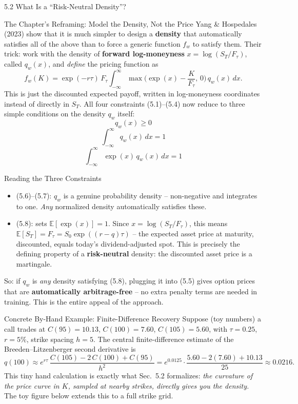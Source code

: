\documentclass[aspectratio=169,10pt]{beamer}
\newcommand{\Exp}{\mathbb{E}}
\begin{document}
\begin{frame}[allowframebreaks]{5.2 What Is a ``Risk-Neutral Density''?}
\framebreak

\begin{block}{The Chapter's Reframing: Model the Density, Not the Price}
Yang \& Hospedales (2023) show that it is much simpler to design a
\textbf{density} that automatically satisfies all of the above than to force
a generic function $f_w$ to satisfy them. Their trick: work with the density
of \textbf{forward log-moneyness} $x = \log(S_T/F_\tau)$, called $q_w(x)$,
and \emph{define} the pricing function as
\[
f_w(K) = \exp(-r\tau)\,F_\tau \int_{-\infty}^{\infty}
   \max\!\Big(\exp(x) - \frac{K}{F_\tau},\,0\Big)\,q_w(x)\,dx. \tag{5.5}
\]
This is just the discounted expected payoff, written in log-moneyness
coordinates instead of directly in $S_T$. All four constraints (5.1)--(5.4)
now reduce to three simple conditions on the density $q_w$ itself:
\[
q_w(x) \ge 0 \tag{5.6}
\]
\[
\int_{-\infty}^{\infty} q_w(x)\,dx = 1 \tag{5.7}
\]
\[
\int_{-\infty}^{\infty} \exp(x)\,q_w(x)\,dx = 1 \tag{5.8}
\]
\end{block}

\framebreak

\begin{block}{Reading the Three Constraints}
\begin{itemize}
  \item (5.6)--(5.7): $q_w$ is a genuine probability density -- non-negative
  and integrates to one. \emph{Any} normalized density automatically
  satisfies these.
  \item (5.8): sets $\Exp[\exp(x)] = 1$. Since $x=\log(S_T/F_\tau)$, this
  means $\Exp[S_T] = F_\tau = S_0\exp((r-q)\tau)$ -- the expected asset
  price at maturity, discounted, equals today's dividend-adjusted spot. This
  is precisely the defining property of a \textbf{risk-neutral} density: the
  discounted asset price is a martingale.
\end{itemize}
So: if $q_w$ is \emph{any} density satisfying (5.8), plugging it into
(5.5) gives option prices that are \textbf{automatically arbitrage-free} --
no extra penalty terms are needed in training. This is the entire appeal of
the approach.
\end{block}

\begin{alertblock}{Concrete By-Hand Example: Finite-Difference Recovery}
Suppose (toy numbers) a call trades at $C(95)=10.13$, $C(100)=7.60$,
$C(105)=5.60$, with $\tau=0.25$, $r=5\%$, strike spacing $h=5$. The
central finite-difference estimate of the Breeden--Litzenberger second
derivative is
\[
q(100) \approx e^{r\tau}\,\frac{C(105) - 2\,C(100) + C(95)}{h^2}
       = e^{0.0125}\cdot\frac{5.60 - 2(7.60) + 10.13}{25} \approx 0.0216.
\]
This tiny hand calculation is exactly what Sec.~5.2 formalizes: \emph{the
curvature of the price curve in $K$, sampled at nearby strikes, directly
gives you the density.} The toy figure below extends this to a full strike
grid.
\end{alertblock}


\end{frame}
\end{document}
